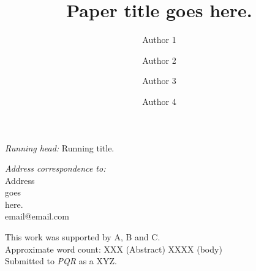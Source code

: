 \title{Paper title goes here.}

\author[1]{Author 1}
\author[1]{Author 2} 
\author[2]{Author 3}
\author[1]{Author 4}

\date{}



\maketitle

\vfill

\noindent
\textit{Running head:} Running title.

\vspace{0.5cm}
\noindent
\textit{Address correspondence to:}  \\
  Address                            \\
  goes                               \\
  here.                              \\
  email@email.com

\vspace{0.5cm}
\noindent
This work was supported by A, B and C.             \\

\vspace{0.3cm}\noindent
Approximate word count: XXX (Abstract) XXXX (body) \\

\vspace{0.3cm}\noindent
Submitted to \textit{PQR} as a XYZ.                \\

\newpage